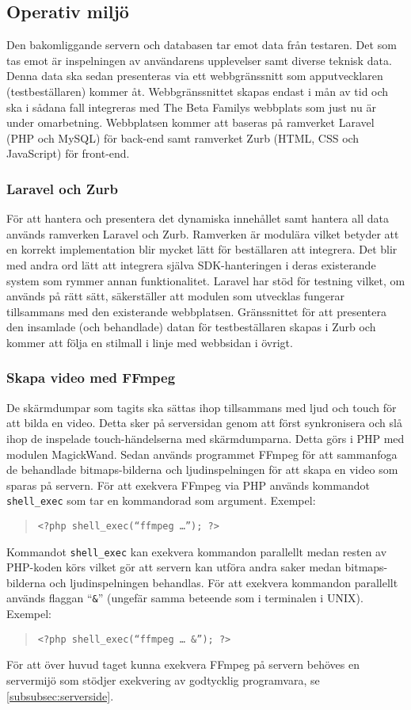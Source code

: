 \subsection{Operativ miljö}
Den bakomliggande servern och databasen tar emot data från testaren. Det som tas emot är inspelningen av användarens upplevelser samt diverse teknisk data. Denna data ska sedan presenteras via ett webbgränssnitt som apputvecklaren (testbeställaren) kommer åt. Webbgränssnittet skapas endast i mån av tid och ska i sådana fall integreras med The Beta Familys webbplats som just nu är under omarbetning. Webbplatsen kommer att baseras på ramverket Laravel (PHP och MySQL) för back-end samt ramverket Zurb (HTML, CSS och JavaScript) för front-end.

\subsubsection{Laravel och Zurb}
För att hantera och presentera det dynamiska innehållet samt hantera all data används ramverken Laravel och Zurb. Ramverken är modulära vilket betyder att en korrekt implementation blir mycket lätt för beställaren att integrera. Det blir med andra ord lätt att integrera själva SDK-hanteringen i deras existerande system som rymmer annan funktionalitet. Laravel har stöd för testning vilket, om används på rätt sätt, säkerställer att modulen som utvecklas fungerar tillsammans med den existerande webbplatsen. Gränssnittet för att presentera den insamlade (och behandlade) datan för testbeställaren skapas i Zurb och kommer att följa en stilmall i linje med webbsidan i övrigt.

\subsubsection{Skapa video med FFmpeg}
De skärmdumpar som tagits ska sättas ihop tillsammans med ljud och touch för att bilda en video. Detta sker på serversidan genom att först synkronisera och slå ihop de inspelade touch-händelserna med skärmdumparna. Detta görs i PHP med modulen MagickWand\parencite{magickwand}. Sedan används programmet FFmpeg\parencite{ffmpeg} för att sammanfoga de behandlade bitmaps-bilderna och ljudinspelningen för att skapa en video som sparas på servern. För att exekvera FFmpeg via PHP används kommandot \texttt{shell\_exec}\parencite{shellexec} som tar en kommandorad som argument. Exempel:
\begin{quote}
\texttt{<?php shell\_exec(``ffmpeg \dots''); ?>}
\end{quote}
Kommandot \texttt{shell\_exec} kan exekvera kommandon parallellt medan resten av PHP-koden körs vilket gör att servern kan utföra andra saker medan bitmaps-bilderna och ljudinspelningen behandlas. För att exekvera kommandon parallellt används flaggan ``\texttt{\&}'' (ungefär samma beteende som i terminalen i UNIX). Exempel:
\begin{quote}
\texttt{<?php shell\_exec(``ffmpeg \dots~\&''); ?>}
\end{quote}
För att över huvud taget kunna exekvera FFmpeg på servern behöves en servermijö som stödjer exekvering av godtycklig programvara, se \ref{subsubsec:serverside}.
